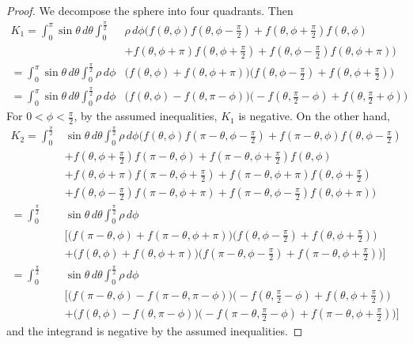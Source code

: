 \documentclass[10pt,a4paper]{amsart}
\begin{document}
\begin{proof}
	We decompose the sphere into four quadrants.  Then
	\begin{align*}
		K_1 = \int_0^\pi \sin\theta \, d\theta \int_{0}^{\tfrac{\pi}{2}} & \rho \, d\phi
		\big(f(\theta, \phi) f(\theta, \phi-\tfrac{\pi}{2}) + f(\theta, \phi+\tfrac{\pi}{2}) f(\theta, \phi)\\
		&+ f(\theta, \phi+\pi) f(\theta, \phi+\tfrac{\pi}{2}) + f(\theta, \phi-\tfrac{\pi}{2}) f(\theta, \phi+\pi) \big)\\
		= \int_0^\pi \sin\theta \, d\theta \int_{0}^{\tfrac{\pi}{2}} \rho \, d\phi
		& \big( f(\theta, \phi) + f(\theta, \phi + \pi) \big) \big( f(\theta, \phi - \tfrac{\pi}{2}) + f(\theta, \phi + \tfrac{\pi}{2}) \big)\\
		= \int_0^\pi \sin\theta \, d\theta \int_{0}^{\tfrac{\pi}{2}} \rho \, d\phi
		& \big( f(\theta, \phi) - f(\theta, \pi - \phi) \big) \big(-f(\theta, \tfrac{\pi}{2} - \phi) + f(\theta, \tfrac{\pi}{2} + \phi) \big)
	\end{align*}
	For $0 < \phi < \tfrac{\pi}{2}$, by the assumed inequalities, $K_1$ is
	negative.  On the other hand,
	\begin{align*}
		K_2 = \int_0^{\tfrac{\pi}{2}} & \sin\theta \, d\theta \int_{0}^{\tfrac{\pi}{2}} \rho \, d\phi \big(
			f(\theta, \phi) f(\pi - \theta, \phi-\tfrac{\pi}{2}) + f(\pi - \theta, \phi) f(\theta, \phi-\tfrac{\pi}{2})\\
			&+f(\theta, \phi+\tfrac{\pi}{2}) f(\pi - \theta, \phi) + f(\pi - \theta, \phi+\tfrac{\pi}{2}) f(\theta, \phi)\\
			&+f(\theta, \phi+\pi) f(\pi - \theta, \phi+\tfrac{\pi}{2}) + f(\pi - \theta, \phi+\pi) f(\theta, \phi+\tfrac{\pi}{2})\\
			&+f(\theta, \phi-\tfrac{\pi}{2}) f(\pi - \theta, \phi+\pi) + f(\pi - \theta, \phi-\tfrac{\pi}{2}) f(\theta, \phi+\pi)
		\big)\\
		= \int_0^{\tfrac{\pi}{2}} & \sin\theta \, d\theta \int_{0}^{\tfrac{\pi}{2}} \rho \, d\phi \\ & \Big[
			\big(f(\pi - \theta, \phi) + f(\pi - \theta, \phi + \pi) \big) \big( f(\theta, \phi - \tfrac{\pi}{2}) + f(\theta, \phi + \tfrac{\pi}{2}) \big) \\
			&+\big(f(\theta, \phi) + f(\theta, \phi + \pi) \big) \big( f(\pi - \theta, \phi - \tfrac{\pi}{2}) + f(\pi - \theta, \phi + \tfrac{\pi}{2}) \big) 
		\Big] \\
		= \int_0^{\tfrac{\pi}{2}} & \sin\theta \, d\theta \int_{0}^{\tfrac{\pi}{2}}\rho \, d\phi \\ & \Big[
			\big(f(\pi - \theta, \phi) - f(\pi - \theta, \pi - \phi) \big) \big( -f(\theta, \tfrac{\pi}{2} - \phi) + f(\theta, \phi + \tfrac{\pi}{2}) \big) \\
			&+\big(f(\theta, \phi) - f(\theta, \pi - \phi) \big) \big( -f(\pi - \theta, \tfrac{\pi}{2} - \phi) + f(\pi - \theta, \phi + \tfrac{\pi}{2}) \big) 
		\Big]
	\end{align*}
	and the integrand is negative by the assumed inequalities.
\end{proof}
\end{document}
